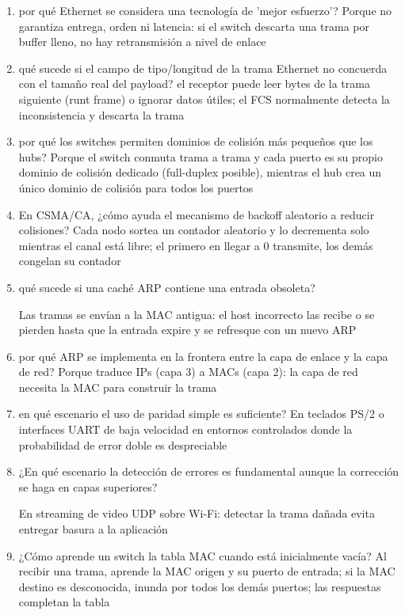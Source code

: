 \begin{enumerate}
\item por qué Ethernet se considera una tecnología de 'mejor esfuerzo'?
Porque no garantiza entrega, orden ni latencia: si el switch descarta una trama por buffer lleno, no hay retransmisión a nivel de enlace

\item qué sucede si el campo de tipo/longitud de la trama Ethernet no concuerda con el tamaño real del payload?
el receptor puede leer bytes de la trama siguiente (runt frame) o ignorar datos útiles; el FCS normalmente detecta la inconsistencia y descarta la trama

\item por qué los switches permiten dominios de colisión más pequeños que los hubs?
Porque el switch conmuta trama a trama y cada puerto es su propio dominio de colisión dedicado (full-duplex posible), mientras el hub crea un único dominio de colisión para todos los puertos

\item En CSMA/CA, ¿cómo ayuda el mecanismo de backoff aleatorio a reducir colisiones?
Cada nodo sortea un contador aleatorio y lo decrementa solo mientras el canal está libre; el primero en llegar a 0 transmite, los demás congelan su contador

\item qué sucede si una caché ARP contiene una entrada obsoleta?

Las tramas se envían a la MAC antigua: el host incorrecto las recibe o se pierden hasta que la entrada expire y se refresque con un nuevo ARP

\item por qué ARP se implementa en la frontera entre la capa de enlace y la capa de red?
Porque traduce IPs (capa 3) a MACs (capa 2): la capa de red necesita la MAC para construir la trama

\item en qué escenario el uso de paridad simple es suficiente?
En teclados PS/2 o interfaces UART de baja velocidad en entornos controlados donde la probabilidad de error doble es despreciable

\item ¿En qué escenario la detección de errores es fundamental aunque la corrección se haga en capas superiores?

En streaming de video UDP sobre Wi-Fi: detectar la trama dañada evita entregar basura a la aplicación

\item ¿Cómo aprende un switch la tabla MAC cuando está inicialmente vacía?
Al recibir una trama, aprende la MAC origen y su puerto de entrada; si la MAC destino es desconocida, inunda por todos los demás puertos; las respuestas completan la tabla


\end{enumerate}
